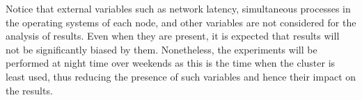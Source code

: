 Notice that external variables such as network latency,   simultaneous processes
in the operating systems of each node,   and other variables are not considered
for the analysis of results.   Even when they are present,   it is expected that
results will not be significantly biased by them.   Nonetheless,   the
experiments will be  performed at night time over weekends as this is the time
 when the cluster is least used,   thus reducing the presence of such variables
and hence their impact on the results.  





  








